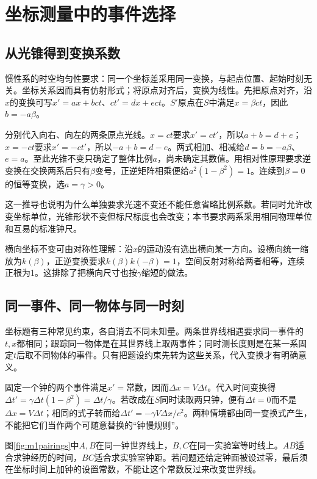 \section{坐标测量中的事件选择}
\subsection{从光锥得到变换系数}
惯性系的时空均匀性要求：同一个坐标差采用同一变换，与起点位置、起始时刻无关。坐标关系因而具有仿射形式；将原点对齐后，变换为线性。先把原点对齐，沿$x$的变换可写$x'=a x+bct$、$ct'=d x+ect$。$S'$原点在$S$中满足$x=\beta ct$，因此$b=-a\beta$。

分别代入向右、向左的两条原点光线。$x=ct$要求$x'=ct'$，所以$a+b=d+e$；$x=-ct$要求$x'=-ct'$，所以$-a+b=d-e$。两式相加、相减给$d=b=-a\beta$、$e=a$。至此光锥不变只确定了整体比例$a$，尚未确定其数值。用相对性原理要求逆变换在交换两系后只有$\beta$变号，正逆矩阵相乘便给$a^2(1-\beta^2)=1$。连续到$\beta=0$的恒等变换，选$a=\gamma>0$。

这一推导也说明为什么单独要求光速不变还不能任意省略比例系数。若同时允许改变坐标单位，光锥形状不变但标尺标度也会改变；本书要求两系采用相同物理单位和互易的标准钟尺。

横向坐标不变可由对称性理解：沿$x$的运动没有选出横向某一方向。设横向统一缩放为$k(\beta)$，正逆变换要求$k(\beta)k(-\beta)=1$，空间反射对称给两者相等，连续正根为1。这排除了把横向尺寸也按$\gamma$缩短的做法。

\subsection{同一事件、同一物体与同一时刻}
坐标题有三种常见约束，各自消去不同未知量。两条世界线相遇要求同一事件的$t,x$都相同；跟踪同一物体是在其世界线上取两事件；同时测长度则是在某一系固定$t$后取不同物体的事件。只有把题设约束先转为这些关系，代入变换才有明确意义。

固定一个钟的两个事件满足$x'=\text{常数}$，因而$\Delta x=V\Delta t$。代入时间变换得$\Delta t'=\gamma\Delta t(1-\beta^2)=\Delta t/\gamma$。若改成在$S$同时读取两只钟，便有$\Delta t=0$而不是$\Delta x=V\Delta t$；相同的式子转而给$\Delta t'=-\gamma V\Delta x/c^2$。两种情境都由同一变换式产生，不能把它们当作两个可随意替换的“钟慢规则”。

图\ref{fig:m1pairings}中$A,B$在同一钟世界线上，$B,C$在同一实验室等时线上。$AB$适合求钟经历的时间，$BC$适合求实验室钟距。若问题还给定钟面被设过零，最后须在坐标时间上加钟的设置常数，不能让这个常数反过来改变世界线。


